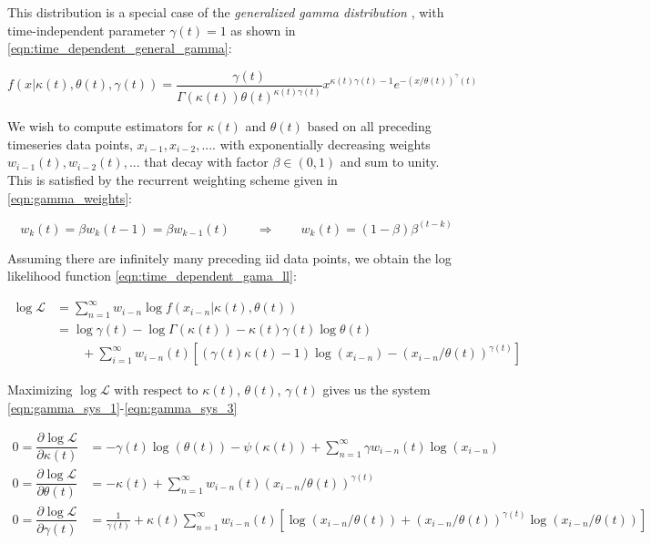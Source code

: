 \documentclass[12pt]{article}
\begin{document}
\noindent This distribution is a special case of the \textit{generalized gamma distribution} \label{eqn:time_dependent_general_gamma}, with time-independent parameter $\gamma(t) = 1$ as shown in \eqref{eqn:time_dependent_general_gamma}:

\begin{equation}
f(x|\kappa(t), \theta(t), \gamma(t)) = \frac{\gamma(t)}{\Gamma(\kappa(t))\theta(t)^{\kappa(t)\gamma(t)}} x^{\kappa(t)\gamma(t)-1}e^{-(x/\theta(t))^\gamma(t)}
\end{equation}

\noindent We wish to compute estimators for $\kappa(t)$ and $\theta(t)$ based on all preceding timeseries data points, $x_{i-1}, x_{i-2}, ....$ with exponentially decreasing weights $w_{i-1}(t), w_{i-2}(t), ...$ that decay with factor $\beta \in (0, 1)$ and sum to unity. This is satisfied by the recurrent weighting scheme given in \eqref{eqn:gamma_weights}:

\begin{equation}
w_{k}(t) = \beta w_{k}(t-1) = \beta w_{k-1}(t) \qquad\Rightarrow\qquad w_{k}(t) = (1-\beta)\beta^{(t-k)}
\label{eqn:gamma_weights}
\end{equation} 

\noindent Assuming there are infinitely many preceding iid data points, we obtain the log likelihood function \eqref{eqn:time_dependent_gama_ll}:

\begin{align}
\log \mathcal{L} & = \sum_{n=1}^\infty w_{i-n}\log f(x_{i-n}|\kappa(t), \theta(t)) \nonumber\\
& = \log \gamma(t) - \log\Gamma(\kappa(t)) - \kappa(t)\gamma(t)\log \theta(t) \nonumber \\ 
& \qquad +\sum_{i=1}^\infty w_{i-n}(t)[(\gamma(t)\kappa(t) - 1)\log(x_{i-n}) - (x_{i-n}/\theta(t))^{\gamma(t)}]
\label{eqn:time_dependent_gama_ll}
\end{align}

\noindent Maximizing $\log\mathcal{L}$ with respect to $\kappa(t)$, $\theta(t)$, $\gamma(t)$ gives us the system \eqref{eqn:gamma_sys_1}-\eqref{eqn:gamma_sys_3}

\begin{align}
0 = \dfrac{\partial \log\mathcal{L}}{\partial \kappa(t)} &= -\gamma(t)\log(\theta(t)) - \psi(\kappa(t)) + \sum_{n=1}^\infty \gamma w_{i-n}(t) \log(x_{i-n})  \label{eqn:gamma_sys_1}\\
0 = \dfrac{\partial \log\mathcal{L}}{\partial \theta(t)} &= -\kappa(t) + \sum_{n=1}^\infty w_{i-n}(t) (x_{i-n}/\theta(t))^{\gamma(t)} \label{eqn:gamma_sys_2}\\
0 = \dfrac{\partial \log\mathcal{L}}{\partial \gamma(t)} &= \frac{1}{\gamma(t)} + \kappa(t)\sum_{n=1}^\infty w_{i-n}(t)\left[ \log(x_{i-n}/\theta(t)) + (x_{i-n}/\theta(t))^{\gamma(t)}\log(x_{i-n}/\theta(t)) \right] \label{eqn:gamma_sys_3}
\end{align}
\end{document}
